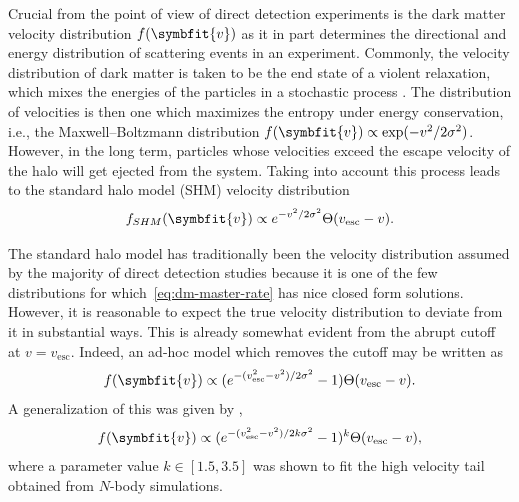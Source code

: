 \documentclass[b5paper, 10pt, twoside]{book}
\renewcommand{\vec}[1]{\symbfit{#1}}
\begin{document}
Crucial from the point of view of direct detection experiments is the dark matter velocity distribution $f(\vec{v})$ as it in part determines the directional and energy distribution of scattering events in an experiment. Commonly, the velocity distribution of dark matter is taken to be the end state of a violent relaxation, which mixes the energies of the particles in a stochastic process \parencite{LyndenBell1967}. The distribution of velocities is then one which maximizes the entropy under energy conservation, i.e., the Maxwell--Boltzmann distribution $f(\vec{v})\propto \exp(-v^2/2\sigma^2)$. However, in the long term, particles whose velocities exceed the escape velocity of the halo will get ejected from the system. Taking into account this process leads to the standard halo model (SHM) velocity distribution
\begin{equation}
f_{SHM}(\vec{v})\propto e^{-v^2/2\sigma^2}\Theta(v_\text{esc}-v).
\label{eq:shm-dist}
\end{equation}

The standard halo model has traditionally been the velocity distribution assumed by the majority of direct detection studies because it is one of the few distributions for which~\eqref{eq:dm-master-rate} has nice closed form solutions. However, it is reasonable to expect the true velocity distribution to deviate from it in substantial ways. This is already somewhat evident from the abrupt cutoff at $v=v_\text{esc}$. Indeed, an ad-hoc model which removes the cutoff may be written as
\begin{equation}
f(\vec{v})\propto(e^{-(v_\text{esc}^2-v^2)/2\sigma^2}-1)\Theta(v_\text{esc}-v).
\end{equation}
A generalization of this was given by \textcite{LisantiEtAl2011},
\begin{equation}
f(\vec{v})\propto(e^{-(v_\text{esc}^2-v^2)/2k\sigma^2}-1)^k\Theta(v_\text{esc}-v),
\end{equation}
where a parameter value $k\in[1.5,3.5]$ was shown to fit the high velocity tail obtained from $N$-body simulations.
\end{document}
